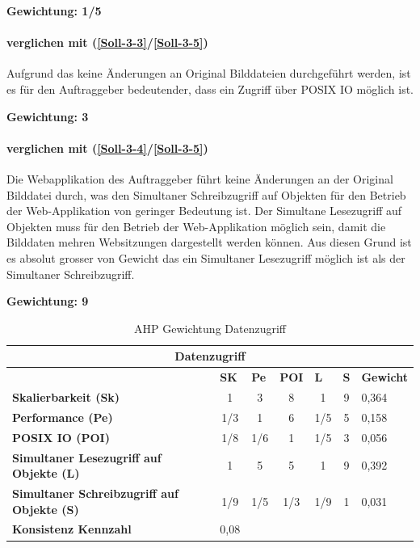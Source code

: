 \textbf{Gewichtung: 1/5}


\paragraph*{ verglichen mit  (\ref{Soll-3-3}/\ref{Soll-3-5})}
 Aufgrund das keine Änderungen an Original Bilddateien durchgeführt werden, ist es für den Auftraggeber bedeutender, dass ein Zugriff über POSIX IO möglich ist.

\textbf{Gewichtung: 3}


\paragraph*{ verglichen mit  (\ref{Soll-3-4}/\ref{Soll-3-5})}
Die Webapplikation des Auftraggeber führt keine Änderungen an der Original Bilddatei durch, was den Simultaner Schreibzugriff auf Objekten für den Betrieb der Web-Applikation von geringer Bedeutung ist. Der Simultane Lesezugriff auf Objekten muss für den Betrieb der Web-Applikation möglich sein, damit die Bilddaten mehren Websitzungen dargestellt werden können. Aus diesen Grund ist es absolut grosser von Gewicht das ein Simultaner Lesezugriff möglich ist als der Simultaner Schreibzugriff.

\textbf{Gewichtung: 9}

\begin{table}[htbp]
\caption{AHP Gewichtung Datenzugriff}
\begin{tabular}{|l|c|c|c|c|c|l|}
\hline
\multicolumn{ 7}{|c|}{\textbf{Datenzugriff}} \\ \hline
 & \multicolumn{1}{l|}{\textbf{SK}} & \multicolumn{1}{l|}{\textbf{Pe}} & \multicolumn{1}{l|}{\textbf{POI}} & \multicolumn{1}{l|}{\textbf{L}} & \multicolumn{1}{l|}{\textbf{S}} & \multicolumn{1}{l|}{\textbf{Gewicht}} \\ \hline
\textbf{Skalierbarkeit (Sk)} & 1 & 3 & 8 & 1 & 9 & 0,364 \\ \hline
\textbf{Performance (Pe)} & 1/3 & 1 & 6 & 1/5 & 5 & 0,158 \\ \hline
\textbf{POSIX IO (POI)} & 1/8 & 1/6 & 1 & 1/5 & 3 & 0,056 \\ \hline
\textbf{Simultaner Lesezugriff auf Objekte (L)} & 1 & 5 & 5 & 1 & 9 & 0,392 \\ \hline
\textbf{Simultaner Schreibzugriff auf Objekte (S)} & 1/9 & 1/5 & 1/3 & 1/9 & 1 & 0,031 \\ \hline
\textbf{Konsistenz Kennzahl} & 0,08 \\ \cline{1-2}
\end{tabular}
\label{tab:AHPDatenzugriff}
\end{table}

